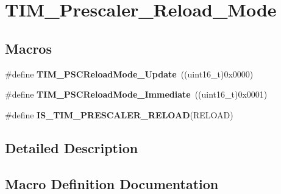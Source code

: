 \hypertarget{group___t_i_m___prescaler___reload___mode}{}\section{T\+I\+M\+\_\+\+Prescaler\+\_\+\+Reload\+\_\+\+Mode}
\label{group___t_i_m___prescaler___reload___mode}
\subsection*{Macros}
\begin{DoxyCompactItemize}
\item 
\#define {\bfseries T\+I\+M\+\_\+\+P\+S\+C\+Reload\+Mode\+\_\+\+Update}~((uint16\+\_\+t)0x0000)\hypertarget{group___t_i_m___prescaler___reload___mode_gad76dd05a3ae4e44e040e0e083bd460bf}{}\label{group___t_i_m___prescaler___reload___mode_gad76dd05a3ae4e44e040e0e083bd460bf}

\item 
\#define {\bfseries T\+I\+M\+\_\+\+P\+S\+C\+Reload\+Mode\+\_\+\+Immediate}~((uint16\+\_\+t)0x0001)\hypertarget{group___t_i_m___prescaler___reload___mode_ga9ba55481ccdcb64268b7b9f2095bfc17}{}\label{group___t_i_m___prescaler___reload___mode_ga9ba55481ccdcb64268b7b9f2095bfc17}

\item 
\#define {\bfseries I\+S\+\_\+\+T\+I\+M\+\_\+\+P\+R\+E\+S\+C\+A\+L\+E\+R\+\_\+\+R\+E\+L\+O\+AD}(R\+E\+L\+O\+AD)
\end{DoxyCompactItemize}


\subsection{Detailed Description}


\subsection{Macro Definition Documentation}
